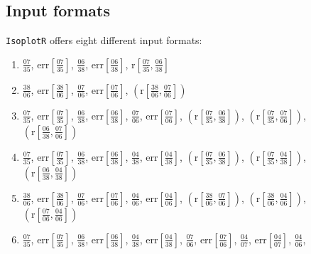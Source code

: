 \begin{refsection}
\section{Input formats}
\label{sec:UPbFormats}

\texttt{IsoplotR} offers eight different input formats:
\begin{enumerate}
  \item
  $\frac{07}{35}$,  
  $\mbox{err}\!\left[\frac{07}{35}\right]$, 
  $\frac{06}{38}$,  
  $\mbox{err}\!\left[\frac{06}{38}\right]$,  
  $\mbox{r}\!\left[\frac{07}{35},\frac{06}{38}\right]$
  \item $\frac{38}{06}$,  
  $\mbox{err}\!\left[\frac{38}{06}\right]$, 
  $\frac{07}{06}$,  
  $\mbox{err}\!\left[\frac{07}{06}\right]$,  
  $\left(\mbox{r}\!\left[\frac{38}{06},\frac{07}{06}\right]\right)$
  \item
  $\frac{07}{35}$,  
  $\mbox{err}\!\left[\frac{07}{35}\right]$, 
  $\frac{06}{38}$,  
  $\mbox{err}\!\left[\frac{06}{38}\right]$, 
  $\frac{07}{06}$,  
  $\mbox{err}\!\left[\frac{07}{06}\right]$, 
  $\left(\mbox{r}\!\left[\frac{07}{35},\frac{06}{38}\right]\right)$,  
  $\left(\mbox{r}\!\left[\frac{07}{35},\frac{07}{06}\right]\right)$, 
  $\left(\mbox{r}\!\left[\frac{06}{38},\frac{07}{06}\right]\right)$
  \item 
  $\frac{07}{35}$,  
  $\mbox{err}\!\left[\frac{07}{35}\right]$, 
  $\frac{06}{38}$,  
  $\mbox{err}\!\left[\frac{06}{38}\right]$,  
  $\frac{04}{38}$,  
  $\mbox{err}\!\left[\frac{04}{38}\right]$, 
  $\left(\mbox{r}\!\left[\frac{07}{35},\frac{06}{38}\right]\right)$,  
  $\left(\mbox{r}\!\left[\frac{07}{35},\frac{04}{38}\right]\right)$, 
  $\left(\mbox{r}\!\left[\frac{06}{38},\frac{04}{38}\right]\right)$
  \item 
  $\frac{38}{06}$,  
  $\mbox{err}\!\left[\frac{38}{06}\right]$, 
  $\frac{07}{06}$,  
  $\mbox{err}\!\left[\frac{07}{06}\right]$,  
  $\frac{04}{06}$,  
  $\mbox{err}\!\left[\frac{04}{06}\right]$, 
  $\left(\mbox{r}\!\left[\frac{38}{06},\frac{07}{06}\right]\right)$,  
  $\left(\mbox{r}\!\left[\frac{38}{06},\frac{04}{06}\right]\right)$, 
  $\left(\mbox{r}\!\left[\frac{07}{06},\frac{04}{06}\right]\right)$
  \item 
  $\frac{07}{35}$,  
  $\mbox{err}\!\left[\frac{07}{35}\right]$, 
  $\frac{06}{38}$,  
  $\mbox{err}\!\left[\frac{06}{38}\right]$,  
  $\frac{04}{38}$,  
  $\mbox{err}\!\left[\frac{04}{38}\right]$,  
  $\frac{07}{06}$,  
  $\mbox{err}\!\left[\frac{07}{06}\right]$, 
  $\frac{04}{07}$,  
  $\mbox{err}\!\left[\frac{04}{07}\right]$,  
  $\frac{04}{06}$,  

\end{enumerate}
\end{refsection}
